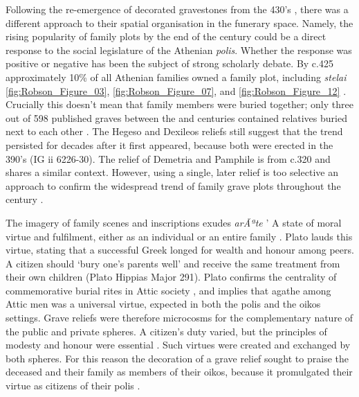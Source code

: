 Following the re-emergence of decorated gravestones from the 430’s \BC, there was a different approach to their spatial organisation in the funerary space. Namely, the rising popularity of family plots by the end of the  century could be a direct response to the social legislature of the Athenian \textit{polis}. Whether the response was positive or negative has been the subject of strong scholarly debate. By c.425 \BC approximately 10\% of all Athenian families owned a family plot, including \textit{stelai} \ref{fig:Robson_Figure_03}, \ref{fig:Robson_Figure_07}, and \ref{fig:Robson_Figure_12} \parencite[41]{Stears2000b}.
Crucially this doesn't mean that family members were buried together; only three out of 598 published graves between the  and  centuries \BC contained relatives buried next to each other \parencite[124]{Pomeroy1997}.
The Hegeso and Dexileos reliefs still suggest that the trend persisted for decades after it first appeared, because both were erected in the 390’s \BC (IG ii 6226-30).
The relief of Demetria and Pamphile is from c.320 \BC and shares a similar context. However, using a single, later relief is too selective an approach to confirm the widespread trend of family grave plots throughout the  century \BC.

The imagery of family scenes and inscriptions exudes \textit{arÃªte} ' A state of moral virtue and fulfilment, either as an individual or an entire family \parencite[117]{Sourvinouinwood1995b}.
Plato lauds this virtue, stating that a successful Greek longed for wealth and honour among peers. A citizen should \enquote*{bury one}s parents well' and receive the same treatment from their own children (Plato Hippias Major 291).
Plato confirms the centrality of commemorative burial rites in Attic society \parencite[22]{Garland2001}, and implies that agathe among Attic men was a universal virtue, expected in both the polis and the oikos settings. Grave reliefs were therefore microcosms for the complementary nature of the public and private spheres.
A citizen’s duty varied, but the principles of modesty and honour were essential \parencite[32]{Burton2003}.
Such virtues were created and exchanged by both spheres. For this reason the decoration of a grave relief sought to praise the deceased and their family as members of their oikos, because it promulgated their virtue as citizens of their polis \parencite[41]{Strauss1993}.

